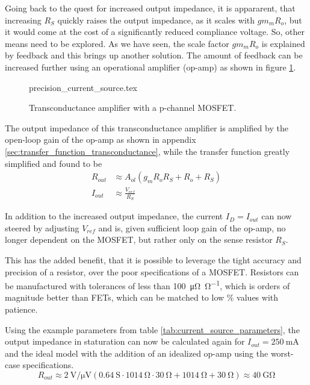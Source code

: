 Going back to the quest for increased output impedance, it is appararent, that increasing $R_S$ quickly raises the output impedance, as it scales with $gm_m R_o$, but it would come at the cost of a significantly reduced compliance voltage. So, other means need to be explored. As we have seen, the scale factor $gm_m R_o$ is explained by feedback and this brings up another solution. The amount of feedback can be increased further using an operational amplifier (op-amp) as shown in figure \ref{fig:precision_current_source}.

\begin{figure}[ht]
    \centering
    {precision_current_source.tex}
    \caption{Transconductance amplifier with a p-channel MOSFET.}
    \label{fig:precision_current_source}
\end{figure}

The output impedance of this transconductance amplifier is amplified by the open-loop gain of the op-amp as shown in appendix \ref{sec:transfer_function_transconductance}, while the transfer function greatly simplified and found to be
\begin{align}
    R_{out} &\approx A_{ol} \left(g_m R_o R_S + R_o + R_S \right) \nonumber\\
    I_{out} &\approx \frac{V_{ref}}{R_S} \label{eqn:current_source_transfer_function}
\end{align}

In addition to the increased output impedance, the current $I_D = I_{out}$ can now steered by adjusting $V_{ref}$ and is, given sufficient loop gain of the op-amp, no longer dependent on the MOSFET, but rather only on the sense resistor $R_S$.

This has the added benefit, that it is possible to leverage the tight accuracy and precision of a resistor, over the poor specifications of a MOSFET. Resistors can be manufactured with tolerances of less than \qty{100}{\micro \ohm \per \ohm}, which is orders of magnitude better than FETs, which can be matched to low \unit{\percent} values with patience.

Using the example parameters from table \ref{tab:current_source_parameters}, the output impedance in staturation can now be calculated again for $I_{out}=\qty{250}{\mA}$ and the ideal  model with the addition of an idealized  op-amp using the worst-case specifications.
\begin{equation}
    R_{out} \approx \qty[per-mode=power]{2}{\volt \per \uV} \left(\qty{0.64}{\siemens}\cdot \qty{1014}{\ohm} \cdot \qty{30}{\ohm} + \qty{1014}{\ohm} + \qty{30}{\ohm} \right) \approx \qty{40}{\giga\ohm}
\end{equation}

